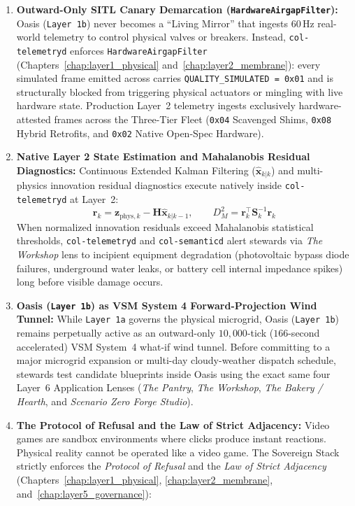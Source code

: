 \begin{enumerate}
    \item \textbf{Outward-Only SITL Canary Demarcation (\texttt{HardwareAirgapFilter}):} Oasis (\texttt{Layer~1b}) never becomes a ``Living Mirror'' that ingests 60\,Hz real-world telemetry to control physical valves or breakers. Instead, \texttt{col-telemetryd} enforces \texttt{HardwareAirgapFilter} (Chapters~\ref{chap:layer1_physical} and~\ref{chap:layer2_membrane}): every simulated frame emitted across  carries \texttt{QUALITY\_SIMULATED = 0x01} and is structurally blocked from triggering physical actuators or mingling with live hardware state. Production Layer~2 telemetry ingests exclusively hardware-attested frames across the Three-Tier Fleet (\texttt{0x04} Scavenged Shims, \texttt{0x08} Hybrid Retrofits, and \texttt{0x02} Native Open-Spec Hardware).
    \item \textbf{Native Layer 2 State Estimation and Mahalanobis Residual Diagnostics:} Continuous Extended Kalman Filtering ($\hat{\mathbf{x}}_{k|k}$) and multi-physics innovation residual diagnostics execute natively inside \texttt{col-telemetryd} at Layer~2:
    \begin{equation}
    \mathbf{r}_k = \mathbf{z}_{\mathrm{phys},k} - \mathbf{H}\hat{\mathbf{x}}_{k|k-1}, \qquad D_M^2 = \mathbf{r}_k^\top \mathbf{S}_k^{-1} \mathbf{r}_k
    \end{equation}
    When normalized innovation residuals exceed Mahalanobis statistical thresholds, \texttt{col-telemetryd} and \texttt{col-semanticd} alert stewards via \textit{The Workshop} lens to incipient equipment degradation (photovoltaic bypass diode failures, underground water leaks, or battery cell internal impedance spikes) long before visible damage occurs.
    \item \textbf{Oasis (\texttt{Layer 1b}) as VSM System 4 Forward-Projection Wind Tunnel:} While \texttt{Layer~1a} governs the physical microgrid, Oasis (\texttt{Layer~1b}) remains perpetually active as an outward-only $10{,}000$-tick ($166$-second accelerated) VSM System~4 what-if wind tunnel. Before committing to a major microgrid expansion or multi-day cloudy-weather dispatch schedule, stewards test candidate blueprints inside Oasis using the exact same four Layer~6 Application Lenses (\textit{The Pantry}, \textit{The Workshop}, \textit{The Bakery / Hearth}, and \textit{Scenario Zero Forge Studio}).
    \item \textbf{The Protocol of Refusal and the Law of Strict Adjacency:} Video games are sandbox environments where clicks produce instant reactions. Physical reality cannot be operated like a video game. The Sovereign Stack strictly enforces the \textit{Protocol of Refusal} and the \textit{Law of Strict Adjacency} (Chapters~\ref{chap:layer1_physical}, \ref{chap:layer2_membrane}, and~\ref{chap:layer5_governance}):

\end{enumerate}
